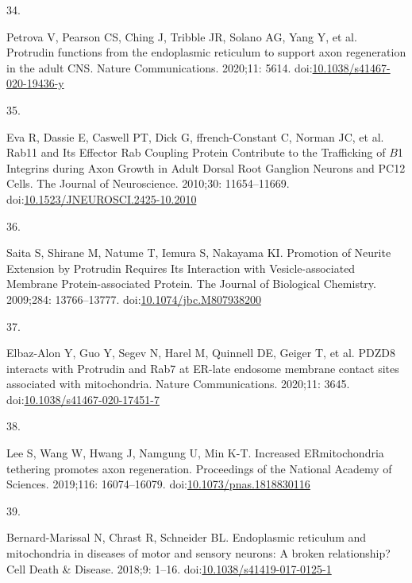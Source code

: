 \documentclass[
  12pt,
  a4paper,
]{book}
\newlength{\cslhangindent}
\newlength{\csllabelwidth}
\newlength{\cslentryspacingunit} %
\newenvironment{CSLReferences}[2] %
 {%
  \setlength{\parindent}{0pt}
  \ifodd #1
  \let\oldpar\par
  \def\par{\hangindent=\cslhangindent\oldpar}
  \fi
  \setlength{\parskip}{#2\cslentryspacingunit}
 }%
 {}
\newcommand{\CSLLeftMargin}[1]{\parbox[t]{\csllabelwidth}{#1}}
\newcommand{\CSLRightInline}[1]{\parbox[t]{\linewidth - \csllabelwidth}{#1}\break}
\begin{document}
\begin{CSLReferences}{0}{0}
\leavevmode{}%
\CSLLeftMargin{34. }%
\CSLRightInline{Petrova V, Pearson CS, Ching J, Tribble JR, Solano AG, Yang Y, et al. Protrudin functions from the endoplasmic reticulum to support axon regeneration in the adult {CNS}. Nature Communications. 2020;11: 5614. doi:\href{https://doi.org/10.1038/s41467-020-19436-y}{10.1038/s41467-020-19436-y}}

\leavevmode{}%
\CSLLeftMargin{35. }%
\CSLRightInline{Eva R, Dassie E, Caswell PT, Dick G, ffrench-Constant C, Norman JC, et al. Rab11 and {Its Effector Rab Coupling Protein Contribute} to the {Trafficking} of {\(B\)}1 {Integrins} during {Axon Growth} in {Adult Dorsal Root Ganglion Neurons} and {PC12 Cells}. The Journal of Neuroscience. 2010;30: 11654--11669. doi:\href{https://doi.org/10.1523/JNEUROSCI.2425-10.2010}{10.1523/JNEUROSCI.2425-10.2010}}

\leavevmode{}%
\CSLLeftMargin{36. }%
\CSLRightInline{Saita S, Shirane M, Natume T, Iemura S, Nakayama KI. Promotion of {Neurite Extension} by {Protrudin Requires Its Interaction} with {Vesicle-associated Membrane Protein-associated Protein}. The Journal of Biological Chemistry. 2009;284: 13766--13777. doi:\href{https://doi.org/10.1074/jbc.M807938200}{10.1074/jbc.M807938200}}

\leavevmode{}%
\CSLLeftMargin{37. }%
\CSLRightInline{Elbaz-Alon Y, Guo Y, Segev N, Harel M, Quinnell DE, Geiger T, et al. {PDZD8} interacts with {Protrudin} and {Rab7} at {ER-late} endosome membrane contact sites associated with mitochondria. Nature Communications. 2020;11: 3645. doi:\href{https://doi.org/10.1038/s41467-020-17451-7}{10.1038/s41467-020-17451-7}}

\leavevmode{}%
\CSLLeftMargin{38. }%
\CSLRightInline{Lee S, Wang W, Hwang J, Namgung U, Min K-T. Increased {ER}\textendash mitochondria tethering promotes axon regeneration. Proceedings of the National Academy of Sciences. 2019;116: 16074--16079. doi:\href{https://doi.org/10.1073/pnas.1818830116}{10.1073/pnas.1818830116}}

\leavevmode{}%
\CSLLeftMargin{39. }%
\CSLRightInline{Bernard-Marissal N, Chrast R, Schneider BL. Endoplasmic reticulum and mitochondria in diseases of motor and sensory neurons: A broken relationship? Cell Death \& Disease. 2018;9: 1--16. doi:\href{https://doi.org/10.1038/s41419-017-0125-1}{10.1038/s41419-017-0125-1}}


\end{CSLReferences}
\end{document}
